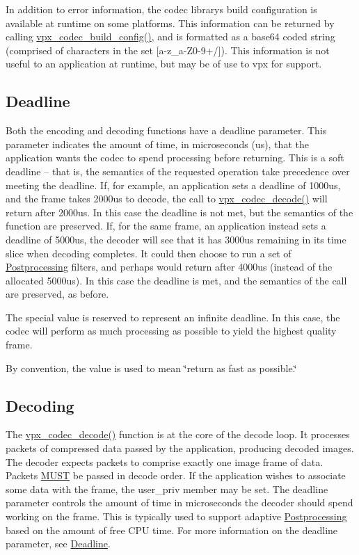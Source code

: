 In addition to error information, the codec library\textquotesingle{}s build configuration is available at runtime on some platforms. This information can be returned by calling \hyperlink{group__codec_ga20922bad85472e76d5f61c21cb423af7}{vpx\+\_\+codec\+\_\+build\+\_\+config()}, and is formatted as a base64 coded string (comprised of characters in the set \mbox{[}a-\/z\+\_\+a-\/\+Z0-\/9+/\mbox{]}). This information is not useful to an application at runtime, but may be of use to vpx for support.\hypertarget{usage_usage_deadline}{}\subsection{Deadline}\label{usage_usage_deadline}
Both the encoding and decoding functions have a {\ttfamily deadline} parameter. This parameter indicates the amount of time, in microseconds (us), that the application wants the codec to spend processing before returning. This is a soft deadline -- that is, the semantics of the requested operation take precedence over meeting the deadline. If, for example, an application sets a {\ttfamily deadline} of 1000us, and the frame takes 2000us to decode, the call to \hyperlink{group__decoder_ga3441e157a7a69108bca9a069f2ee8e0d}{vpx\+\_\+codec\+\_\+decode()} will return after 2000us. In this case the deadline is not met, but the semantics of the function are preserved. If, for the same frame, an application instead sets a {\ttfamily deadline} of 5000us, the decoder will see that it has 3000us remaining in its time slice when decoding completes. It could then choose to run a set of \hyperlink{usage_decode_usage_postproc}{Postprocessing} filters, and perhaps would return after 4000us (instead of the allocated 5000us). In this case the deadline is met, and the semantics of the call are preserved, as before.

The special value {} is reserved to represent an infinite deadline. In this case, the codec will perform as much processing as possible to yield the highest quality frame.

By convention, the value {} is used to mean \char`\"{}return as fast as
 possible.\char`\"{} \hypertarget{usage_decode}{}\subsection{Decoding}\label{usage_decode}
The \hyperlink{group__decoder_ga3441e157a7a69108bca9a069f2ee8e0d}{vpx\+\_\+codec\+\_\+decode()} function is at the core of the decode loop. It processes packets of compressed data passed by the application, producing decoded images. The decoder expects packets to comprise exactly one image frame of data. Packets \hyperlink{rfc2119_MUST}{M\+U\+ST} be passed in decode order. If the application wishes to associate some data with the frame, the {\ttfamily user\+\_\+priv} member may be set. The {\ttfamily deadline} parameter controls the amount of time in microseconds the decoder should spend working on the frame. This is typically used to support adaptive \hyperlink{usage_decode_usage_postproc}{Postprocessing} based on the amount of free C\+PU time. For more information on the {\ttfamily deadline} parameter, see \hyperlink{usage_usage_deadline}{Deadline}.

